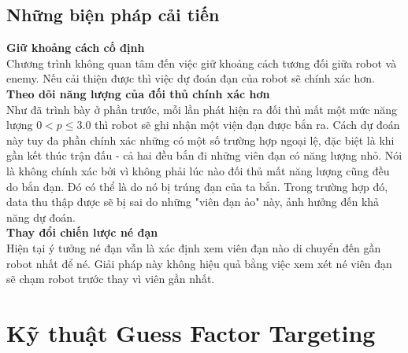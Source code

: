 \documentclass[14pt]{article}
\begin{document}
\subsection{Những biện pháp cải tiến}
{\bf Giữ khoảng cách cố định}\\
Chương trình không quan tâm đến việc giữ khoảng cách tương đối giữa robot và enemy. Nếu cải thiện được thì việc dự đoán đạn của robot sẽ chính xác hơn.\\
{\bf Theo dõi năng lượng của đối thủ chính xác hơn}\\
Như đã trình bày ở phần trước, mỗi lần phát hiện ra đối thủ mất một mức năng lượng $0 < p \leq 3.0$ thì robot sẽ ghi nhận một viện đạn được bắn ra. Cách dự đoán này tuy đa phần chính xác những có một số trường hợp ngoại lệ, đặc biệt là khi gần kết thúc trận đấu - cả hai đều bắn đi những viên đạn có năng lượng nhỏ. Nói là không chính xác bởi vì không phải lúc nào đối thủ mất năng lượng cũng đều do bắn đạn. Đó có thể là do nó bị trúng đạn của ta bắn. Trong trường hợp đó, data thu thập được sẽ bị sai do những "viên đạn ảo" này, ảnh hưởng đến khả năng dự đoán.\\
{\bf Thay đổi chiến lược né đạn}\\
Hiện tại ý tưởng né đạn vẫn là xác định xem viên đạn nào di chuyển đến gần robot nhất để né. Giải pháp này không hiệu quả bằng việc xem xét né viên đạn sẽ chạm robot trước thay vì viên gần nhất.
\section{Kỹ thuật Guess Factor Targeting}
\end{document}
